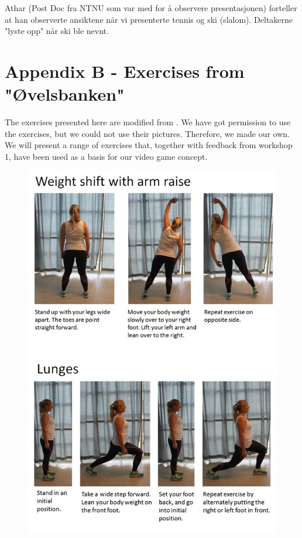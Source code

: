 Athar (Post Doc fra NTNU som var med for å observere presentasjonen) forteller at han observerte ansiktene når vi presenterte 
tennis og ski (slalom). Deltakerne "lyste opp" når ski ble nevnt.

\newpage
\section*{Appendix B - Exercises from "{Ø}velsbanken"}
\label{app:exercises}

The exercises presented here are modified from \cite{eldretrening}. We have got permission to use the exercises, but we could not use their pictures. Therefore, we made our own. We will present a range of exercises that, together with feedback from workshop 1, have been used as a basis for our video game concept.

\begin{figure} [ht!]
\centering
\includegraphics[scale=0.8]{WeightShift.jpg}
\label{weightshift}
\end{figure} 

